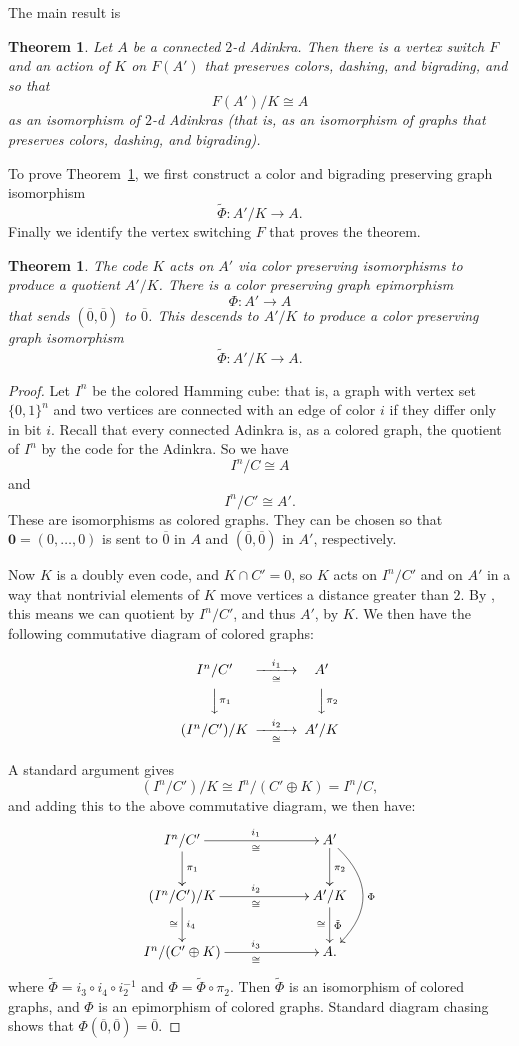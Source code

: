 \documentclass[12pt,twoside,singlespace]{article}
\numberwithin{equation}{section}
\newtheorem{thm}[equation]{Theorem}
\theoremstyle{definition}
\renewcommand{\vec}[1]{\mathbf{#1}}
\begin{document}
The main result is
\begin{thm}
\label{thm:quotient}
Let $A$ be a connected $2$-d Adinkra.  Then there is a vertex switch $F$ and an action of $K$ on $F(A')$ that preserves colors, dashing, and bigrading, and so that
\[F(A')/K\cong A\]
as an isomorphism of $2$-d Adinkras (that is, as an isomorphism of graphs that preserves colors, dashing, and bigrading).
\end{thm}

To prove Theorem~\ref{thm:quotient}, we first construct a color and bigrading preserving graph isomorphism
\[\tilde{\Phi}:A'/K\to A.\]
Finally we identify the vertex switching $F$ that proves the theorem.


\begin{thm}
\label{thm:isocolors}
The code $K$ acts on $A'$ via color preserving isomorphisms to produce a quotient $A'/K$.  There is a color preserving graph epimorphism
\[\Phi:A' \to A\]
that sends $(\overline{0},\overline{0})$ to $\overline{0}$.  This descends to $A'/K$ to produce a color preserving graph isomorphism
\[\tilde{\Phi}:A'/K\to A.\]
\end{thm}
\begin{proof}
Let $I^n$ be the colored Hamming cube: that is, a graph with vertex set $\{0,1\}^n$ and two vertices are connected with an edge of color $i$ if they differ only in bit $i$.  Recall that every connected Adinkra is, as a colored graph, the quotient of $I^n$ by the code for the Adinkra.\cite{d2l:omni}  So we have
\[I^n/C \cong A\]
and
\[I^n/C'\cong A'.\]
These are isomorphisms as colored graphs.  They can be chosen so that $\vec{0}=(0,\ldots,0)$ is sent to $\overline{0}$ in $A$ and $(\overline{0},\overline{0})$ in $A'$, respectively.

Now $K$ is a doubly even code, and $K\cap C'=0$, so $K$ acts on $I^n/C'$ and on $A'$ in a way that nontrivial elements of $K$ move vertices a distance greater than $2$.  By \cite{zhang:adinkras}, this means we can quotient by $I^n/C'$, and thus $A'$, by $K$.  We then have the following commutative diagram of colored graphs:

\[
\begin{CD}
I^n/C' @>i_1>\cong> A'\\
@VV\pi_1 V @VV\pi_2 V\\
(I^n/C')/K @>i_2>\cong> A'/K\\
\end{CD}  
\]

A standard argument gives
\[(I^n/C')/K \cong I^n/(C'\oplus K)=I^n/C,\]
and adding this to the above commutative diagram, we then have:
\[
\xymatrixcolsep{5pc}
\xymatrix{
I^n/C' \ar[d]^{\pi_1} \ar[r]^{i_1}_{\cong} &A'\ar[d]^{\pi_2}\ar@/^2pc/[dd]^{\Phi} \\
(I^n/C')/K \ar[d]^{i_4}_{\cong} \ar[r]^{i_2}_\cong &A'/K\ar[d]_{\cong}^{\tilde{\Phi}}\\
I^n/(C'\oplus K) \ar[r]^{i_3}_\cong &A.}
\]
where $\tilde{\Phi}=i_3\circ i_4\circ i_2^{-1}$ and $\Phi=\tilde{\Phi}\circ \pi_2$.  Then $\tilde{\Phi}$ is an isomorphism of colored graphs, and $\Phi$ is an epimorphism of colored graphs.  Standard diagram chasing shows that $\Phi(\overline{0},\overline{0})=\overline{0}$.
\end{proof}
\end{document}
